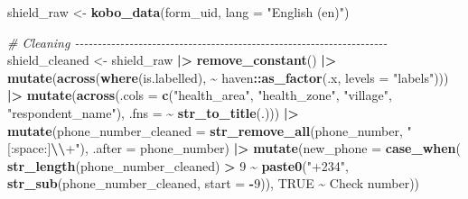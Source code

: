 \documentclass[
]{article}
\newenvironment{Shaded}{\begin{snugshade}}{\end{snugshade}}
\newcommand{\AttributeTok}[1]{\textcolor[rgb]{0.13,0.29,0.53}{#1}}
\newcommand{\CommentTok}[1]{\textcolor[rgb]{0.56,0.35,0.01}{\textit{#1}}}
\newcommand{\ConstantTok}[1]{\textcolor[rgb]{0.56,0.35,0.01}{#1}}
\newcommand{\DecValTok}[1]{\textcolor[rgb]{0.00,0.00,0.81}{#1}}
\newcommand{\FunctionTok}[1]{\textcolor[rgb]{0.13,0.29,0.53}{\textbf{#1}}}
\newcommand{\NormalTok}[1]{#1}
\newcommand{\OtherTok}[1]{\textcolor[rgb]{0.56,0.35,0.01}{#1}}
\newcommand{\SpecialCharTok}[1]{\textcolor[rgb]{0.81,0.36,0.00}{\textbf{#1}}}
\newcommand{\StringTok}[1]{\textcolor[rgb]{0.31,0.60,0.02}{#1}}
\begin{document}
\begin{Shaded}
\begin{Highlighting}[]
\NormalTok{shield\_raw }\OtherTok{\textless{}{-}} \FunctionTok{kobo\_data}\NormalTok{(form\_uid, }\AttributeTok{lang =} \StringTok{"English (en)"}\NormalTok{)}

\CommentTok{\# Cleaning {-}{-}{-}{-}{-}{-}{-}{-}{-}{-}{-}{-}{-}{-}{-}{-}{-}{-}{-}{-}{-}{-}{-}{-}{-}{-}{-}{-}{-}{-}{-}{-}{-}{-}{-}{-}{-}{-}{-}{-}{-}{-}{-}{-}{-}{-}{-}{-}{-}{-}{-}{-}{-}{-}{-}{-}{-}{-}{-}{-}{-}{-}{-}{-}{-}{-}{-}{-}{-}}
\NormalTok{shield\_cleaned }\OtherTok{\textless{}{-}}\NormalTok{ shield\_raw }\SpecialCharTok{|\textgreater{}} 
  \FunctionTok{remove\_constant}\NormalTok{() }\SpecialCharTok{|\textgreater{}} 
  \FunctionTok{mutate}\NormalTok{(}\FunctionTok{across}\NormalTok{(}\FunctionTok{where}\NormalTok{(is.labelled), }\SpecialCharTok{\textasciitilde{}}\NormalTok{ haven}\SpecialCharTok{::}\FunctionTok{as\_factor}\NormalTok{(.x, }\AttributeTok{levels =} \StringTok{"labels"}\NormalTok{))) }\SpecialCharTok{|\textgreater{}} 
  \FunctionTok{mutate}\NormalTok{(}\FunctionTok{across}\NormalTok{(}\AttributeTok{.cols =} \FunctionTok{c}\NormalTok{(}\StringTok{"health\_area"}\NormalTok{, }\StringTok{"health\_zone"}\NormalTok{, }\StringTok{"village"}\NormalTok{, }\StringTok{"respondent\_name"}\NormalTok{), }\AttributeTok{.fns =} \SpecialCharTok{\textasciitilde{}} \FunctionTok{str\_to\_title}\NormalTok{(.))) }\SpecialCharTok{|\textgreater{}} 
  \FunctionTok{mutate}\NormalTok{(}\AttributeTok{phone\_number\_cleaned =} \FunctionTok{str\_remove\_all}\NormalTok{(phone\_number, }\StringTok{"[:space:]}\SpecialCharTok{\textbackslash{}\textbackslash{}}\StringTok{+"}\NormalTok{), }\AttributeTok{.after =}\NormalTok{ phone\_number) }\SpecialCharTok{|\textgreater{}} 
  \FunctionTok{mutate}\NormalTok{(}\AttributeTok{new\_phone =} \FunctionTok{case\_when}\NormalTok{(}
    \FunctionTok{str\_length}\NormalTok{(phone\_number\_cleaned) }\SpecialCharTok{\textgreater{}} \DecValTok{9} \SpecialCharTok{\textasciitilde{}} \FunctionTok{paste0}\NormalTok{(}\StringTok{"+234"}\NormalTok{, }\FunctionTok{str\_sub}\NormalTok{(phone\_number\_cleaned, }\AttributeTok{start =} \SpecialCharTok{{-}}\DecValTok{9}\NormalTok{)),}
    \ConstantTok{TRUE} \SpecialCharTok{\textasciitilde{}} \StringTok{\textquotesingle{}Check number\textquotesingle{}}\NormalTok{))}
\end{Highlighting}
\end{Shaded}
\end{document}
